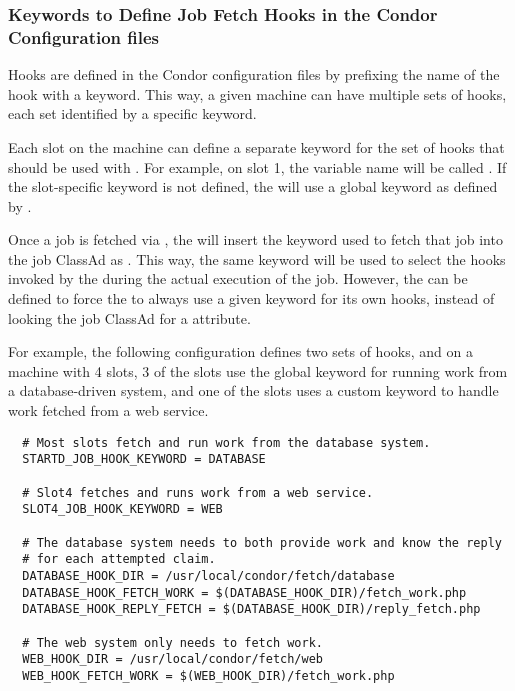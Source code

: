 \subsubsection{\label{sec:job-hooks-keywords}
Keywords to Define Job Fetch Hooks in the Condor Configuration files }

Hooks are defined in the Condor configuration files by prefixing
the name of the hook with a keyword.
This way, a given machine can have multiple sets of hooks, each set
identified by a specific keyword.

Each slot on the machine can define a separate keyword for the set
of hooks that should be used with .
For example, on slot 1, the variable name will be
called .
If the slot-specific keyword is not defined, the  will
use a global keyword as defined by .

Once a job is fetched via , the
 will insert the keyword used to fetch that job into
the job ClassAd as .
This way, the same keyword will be used to select the hooks invoked by
the  during the actual execution of the job.
However, the  can be defined to
force the  to always use a given keyword for its own
hooks, instead of looking the job ClassAd for a 
attribute.

For example, the following configuration defines two sets of hooks,
and on a machine with 4 slots, 3 of the slots use the global keyword
for running work from a database-driven system, and one of the slots
uses a custom keyword to handle work fetched from a web service.
\footnotesize
\begin{verbatim}
  # Most slots fetch and run work from the database system.
  STARTD_JOB_HOOK_KEYWORD = DATABASE

  # Slot4 fetches and runs work from a web service.
  SLOT4_JOB_HOOK_KEYWORD = WEB

  # The database system needs to both provide work and know the reply
  # for each attempted claim.
  DATABASE_HOOK_DIR = /usr/local/condor/fetch/database
  DATABASE_HOOK_FETCH_WORK = $(DATABASE_HOOK_DIR)/fetch_work.php
  DATABASE_HOOK_REPLY_FETCH = $(DATABASE_HOOK_DIR)/reply_fetch.php

  # The web system only needs to fetch work.
  WEB_HOOK_DIR = /usr/local/condor/fetch/web
  WEB_HOOK_FETCH_WORK = $(WEB_HOOK_DIR)/fetch_work.php
\end{verbatim}
\normalsize

